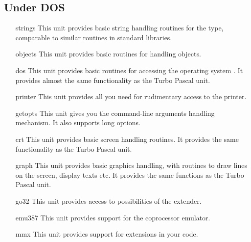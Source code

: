\documentclass{report}
\begin{document}
%
%
\subsection{Under DOS}
\begin{itemize}
\item [strings] This unit provides basic
string handling routines for the  type, comparable to similar
routines in standard  libraries.
\item [objects]  This unit provides basic
routines for handling objects.
\item [dos] This unit provides basic routines for
accessing the operating system \dos. It provides almost the same
functionality as the Turbo Pascal unit. 
\item [printer]  This unit provides all you
need for rudimentary access to the printer.
\item [getopts] This unit gives you the
\gnu {} command-line arguments  handling mechanism. 
It also supports long options.
\item [crt] This unit provides basic screen
handling routines. It provides the same functionality  as the Turbo Pascal 
unit.
\item [graph] This unit provides basic graphics
handling, with routines to draw lines on the screen, display texts etc. It
provides the same functions as the Turbo Pascal unit.
\item [go32] This unit provides access to possibilities of the 
\dos extender.
\item [emu387] This unit provides support for the coprocessor emulator.
\item [mmx] This unit provides support for  extensions in your
code.
\end{itemize}

%
%
\end{document}
